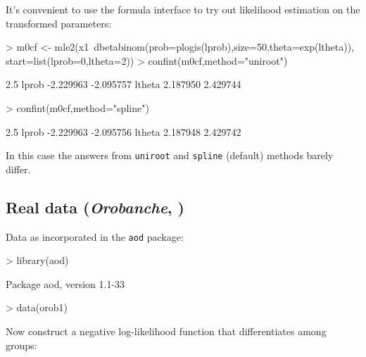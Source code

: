 \documentclass{article}
\newcommand{\code}[1]{{\tt #1}}
\begin{document}
It's convenient to use the formula interface
to try out likelihood estimation on the
transformed parameters:
\begin{Schunk}
\begin{Sinput}
> m0cf <- mle2(x1~dbetabinom(prob=plogis(lprob),size=50,theta=exp(ltheta)),
             start=list(lprob=0,ltheta=2))
> confint(m0cf,method="uniroot")
\end{Sinput}
\begin{Soutput}
           2.5 %
lprob  -2.229963 -2.095757
ltheta  2.187950  2.429744
\end{Soutput}
\begin{Sinput}
> confint(m0cf,method="spline")
\end{Sinput}
\begin{Soutput}
           2.5 %
lprob  -2.229963 -2.095756
ltheta  2.187948  2.429742
\end{Soutput}
\end{Schunk}

In this case the answers from \code{uniroot}
and \code{spline} (default) methods barely
differ.

\subsection{Real data (\emph{Orobanche}, \cite{Crowder1978})}
Data as incorporated in the \code{aod} package:
\begin{Schunk}
\begin{Sinput}
> library(aod)
\end{Sinput}
\begin{Soutput}
Package aod, version 1.1-33 
\end{Soutput}
\begin{Sinput}
> data(orob1)
\end{Sinput}
\end{Schunk}

Now construct a negative log-likelihood
function that differentiates among groups:
\begin{Schunk}
\end{Schunk}
\end{document}
